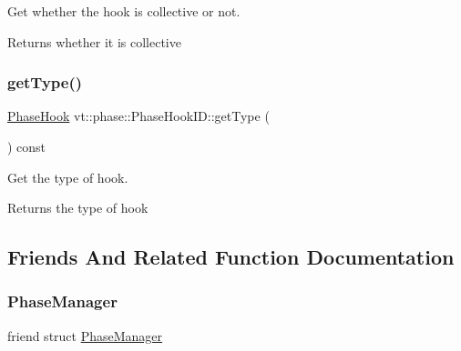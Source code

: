 Get whether the hook is collective or not. 

\begin{DoxyReturn}{Returns}
whether it is collective 
\end{DoxyReturn}
\mbox{\label{structvt_1_1phase_1_1_phase_hook_i_d_a2174260d92495e701ce0636e62b25004}} 
\subsubsection{\texorpdfstring{get\+Type()}{getType()}}
{\footnotesize\ttfamily \hyperlink{namespacevt_1_1phase_aec9a63fdd99680d7a7fe99d321193811}{Phase\+Hook} vt\+::phase\+::\+Phase\+Hook\+I\+D\+::get\+Type (\begin{DoxyParamCaption}{ }\end{DoxyParamCaption}) const\hspace{0.3cm}{\ttfamily [inline]}}



Get the type of hook. 

\begin{DoxyReturn}{Returns}
the type of hook 
\end{DoxyReturn}


\subsection{Friends And Related Function Documentation}
\mbox{\label{structvt_1_1phase_1_1_phase_hook_i_d_a346e5d84677fffb1e9f1f393b7d13779}} 
\subsubsection{\texorpdfstring{Phase\+Manager}{PhaseManager}}
{\footnotesize\ttfamily friend struct \hyperlink{structvt_1_1phase_1_1_phase_manager}{Phase\+Manager}\hspace{0.3cm}{\ttfamily [friend]}}



